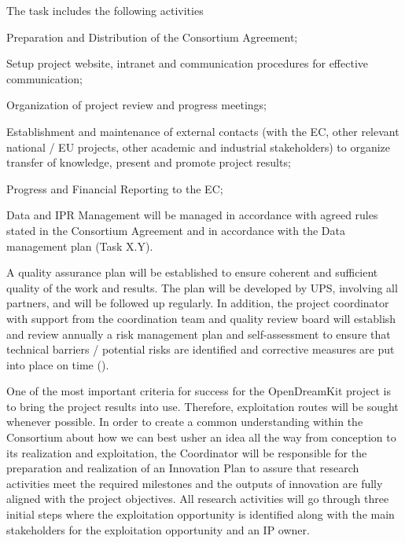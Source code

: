 \begin{workpackage}
\begin{tasklist}
\begin{task}[title=Project and financial management,
id=project-finance-management,lead=PS,PM=33]
The task includes the following activities
  \begin{compactitem}
  \item Preparation and Distribution of the
    Consortium Agreement;
  \item Setup project website, intranet and
    communication procedures for effective communication;
  \item
    Organization of project review and progress meetings;
  \item
    Establishment and maintenance of external contacts (with the EC,
    other relevant national / EU projects, other academic and
    industrial stakeholders) to organize transfer of knowledge,
    present and
promote project results;
  \item Progress and Financial Reporting to the EC;
  \item Data and IPR Management will be managed in accordance with agreed rules stated in the
Consortium Agreement and in accordance with the Data management plan (Task X.Y).
  \end{compactitem}
\end{task}

\begin{task}[title=Quality assurance and risk management,id=project-finance-management,lead=PS,PM=15]
A quality assurance plan will be established to ensure coherent and sufficient quality of the work
and results. The plan will be developed by UPS, involving all partners, and will be followed up
regularly. In addition, the project coordinator with support from the coordination team and quality review board will establish and review annually a risk management plan and self-assessment to ensure that technical barriers / potential risks are identified  and corrective measures are put into place on time ().
\end{task}

\begin{task}[title=Innovation management,
id=project-finance-management,lead=PS,PM=10]

One of the most important criteria for success for the OpenDreamKit project is to bring the project results into use. Therefore, exploitation routes will be sought whenever possible. In
order to create a common understanding within the Consortium about how we can best usher
an idea all the way from conception to its realization and exploitation, the Coordinator will be responsible for
the preparation and realization of an Innovation Plan to assure that research activities meet the
required milestones and the outputs of innovation are fully aligned with the project objectives.
All research activities will go through three initial steps where the exploitation opportunity is
identified along with the main stakeholders for the exploitation opportunity and an IP owner.
\end{task}
\end{tasklist}


\end{workpackage}
